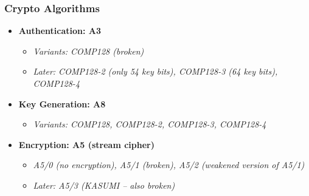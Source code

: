 \subsubsection{Crypto Algorithms}
\begin{itemize}
    \item \textbf{Authentication: A3}
    \begin{itemize}
        \item \emph{Variants: COMP128 (broken)}
        \item \emph{Later: COMP128-2 (only 54 key bits), COMP128-3 (64 key bits), COMP128-4}
    \end{itemize}

    \item \textbf{Key Generation: A8}
    \begin{itemize}
        \item \emph{Variants: COMP128, COMP128-2, COMP128-3, COMP128-4}
    \end{itemize}

    \item \textbf{Encryption: A5 (stream cipher)}
    \begin{itemize}
        \item \emph{A5/0 (no encryption), A5/1 (broken), A5/2 (weakened version of A5/1)}
        \item \emph{Later: A5/3 (KASUMI -- also broken)}
    \end{itemize}
\end{itemize}

